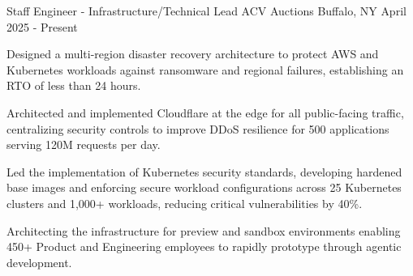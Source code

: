 
\begin{cventries}

  \cventry
    {Staff Engineer - Infrastructure/Technical Lead} %
    {ACV Auctions} %
    {Buffalo, NY} %
    {April 2025 - Present} %
    {
      \begin{cvitems} %
        \item {Designed a multi-region disaster recovery architecture to protect AWS and Kubernetes workloads against ransomware and regional failures, establishing an RTO of less than 24 hours.}
        \item {Architected and implemented Cloudflare at the edge for all public-facing traffic, centralizing security controls to improve DDoS resilience for 500 applications serving 120M requests per day.}
        \item {Led the implementation of Kubernetes security standards, developing hardened base images and enforcing secure workload configurations across 25 Kubernetes clusters and 1,000+ workloads, reducing critical vulnerabilities by 40\%.}
        \item {Architecting the infrastructure for preview and sandbox environments enabling 450+ Product and Engineering employees to rapidly prototype through agentic development.}
      \end{cvitems}
    }


\end{cventries}
